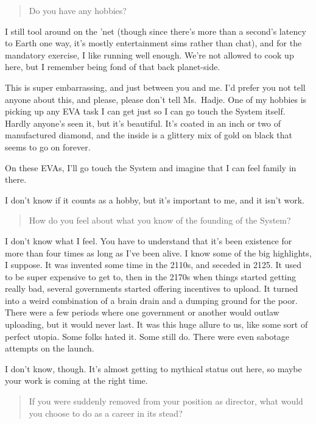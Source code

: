 \begin{quote}
Do you have any hobbies?
\end{quote}

\noindent I still tool around on the 'net (though since there's more than a second's latency to Earth one way, it's mostly entertainment sims rather than chat), and for the mandatory exercise, I like running well enough. We're not allowed to cook up here, but I remember being fond of that back planet-side.

This is super embarrassing, and just between you and me. I'd prefer you not tell anyone about this, and please, please don't tell Ms.~Hadje. One of my hobbies is picking up any EVA task I can get just so I can go touch the System itself. Hardly anyone's seen it, but it's beautiful. It's coated in an inch or two of manufactured diamond, and the inside is a glittery mix of gold on black that seems to go on forever.

On these EVAs, I'll go touch the System and imagine that I can feel family in there.

I don't know if it counts as a hobby, but it's important to me, and it isn't work.

\begin{quote}
How do you feel about what you know of the founding of the System?
\end{quote}

\noindent I don't know what I feel. You have to understand that it's been existence for more than four times as long as I've been alive. I know some of the big highlights, I suppose. It was invented some time in the 2110s, and seceded in 2125. It used to be super expensive to get to, then in the 2170s when things started getting really bad, several governments started offering incentives to upload. It turned into a weird combination of a brain drain and a dumping ground for the poor. There were a few periods where one government or another would outlaw uploading, but it would never last. It was this huge allure to us, like some sort of perfect utopia. Some folks hated it. Some still do. There were even sabotage attempts on the launch.

I don't know, though. It's almost getting to mythical status out here, so maybe your work is coming at the right time.

\begin{quote}
If you were suddenly removed from your position as director, what would you choose to do as a career in its stead?
\end{quote}

